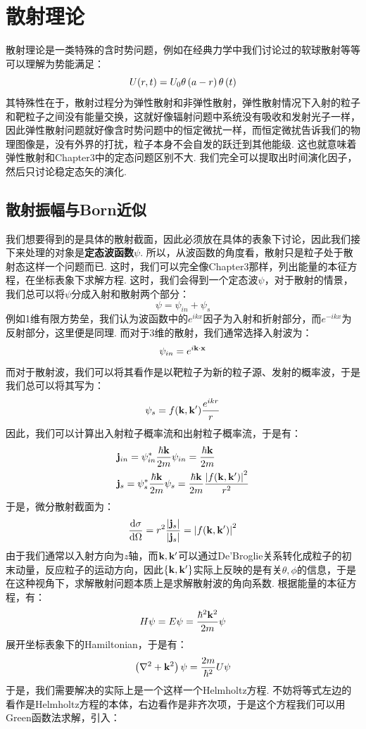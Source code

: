 \section{散射理论}
散射理论是一类特殊的含时势问题，例如在经典力学中我们讨论过的软球散射等等可以理解为势能满足：
\[
U(r,t) = U_{0}\theta\left({a - r}\right)\theta\left({t}\right)
\]
其特殊性在于，散射过程分为弹性散射和非弹性散射，弹性散射情况下入射的粒子和靶粒子之间没有能量交换，这就好像辐射问题中系统没有吸收和发射光子一样，因此弹性散射问题就好像含时势问题中的恒定微扰一样，而恒定微扰告诉我们的物理图像是，没有外界的打扰，粒子本身不会自发的跃迁到其他能级. 这也就意味着弹性散射和Chapter3中的定态问题区别不大. 我们完全可以提取出时间演化因子，然后只讨论稳定态矢的演化. 
\subsection{散射振幅与Born近似}
我们想要得到的是具体的散射截面，因此必须放在具体的表象下讨论，因此我们接下来处理的对象是\textbf{定态波函数\(\psi\)}. 所以，从波函数的角度看，散射只是粒子处于散射态这样一个问题而已. 这时，我们可以完全像Chapter3那样，列出能量的本征方程，在坐标表象下求解方程. 这时，我们会得到一个定态波\(\psi\)，对于散射的情景，我们总可以将\(\psi\)分成入射和散射两个部分：
\[
\psi = \psi_{in} + \psi_{s}
\]
例如1维有限方势垒，我们认为波函数中的\(e^{ikx}\)因子为入射和折射部分，而\(e^{-ikx}\)为反射部分，这里便是同理. 而对于3维的散射，我们通常选择入射波为：
\[
\psi_{in} = e^{i\mathbf{k}\cdot\mathbf{x}}
\]
而对于散射波，我们可以将其看作是以靶粒子为新的粒子源、发射的概率波，于是我们总可以将其写为：
\[
\psi_{s} = f(\mathbf{k},\mathbf{k}')\frac{e^{ikr}}{r}
\]
因此，我们可以计算出入射粒子概率流和出射粒子概率流，于是有：
\begin{align*}
& \mathbf{j}_{in} = \psi^{*}_{in}\frac{\hbar\mathbf{k}}{2m}\psi_{in} = \frac{\hbar\mathbf{k}}{2m} \\
& \mathbf{j}_{s} = \psi^{*}_{s}\frac{\hbar\mathbf{k}}{2m}\psi_{s} = \frac{\hbar\mathbf{k}}{2m}\frac{\abs{f(\mathbf{k},\mathbf{k}')}^{2}}{r^{2}}
\end{align*}
于是，微分散射截面为：
\[
\frac{\mathrm{d}{\sigma}}{\mathrm{d}\Omega} = r^{2}\frac{\abs{\mathbf{j}_{s}}}{\abs{\mathbf{j}_{s}}} = \abs{f(\mathbf{k},\mathbf{k}')}^{2}
\]
由于我们通常以入射方向为\(z\)轴，而\(\mathbf{k},\mathbf{k}'\)可以通过De'Broglie关系转化成粒子的初末动量，反应粒子的运动方向，因此\(\left\{{\mathbf{k},\mathbf{k}'}\right\}\)实际上反映的是有关\(\theta,\phi\)的信息，于是在这种视角下，求解散射问题本质上是求解散射波的角向系数. 根据能量的本征方程，有：
\[
H\psi = E\psi = \frac{\hbar^{2}\mathbf{k}^{2}}{2m}\psi
\]
展开坐标表象下的Hamiltonian，于是有：
\[
\left({\nabla^{2} + \mathbf{k}^{2}}\right)\psi = \frac{2m}{\hbar^{2}}U\psi
\]
于是，我们需要解决的实际上是一个这样一个Helmholtz方程. 不妨将等式左边的看作是Helmholtz方程的本体，右边看作是非齐次项，于是这个方程我们可以用Green函数法求解，引入：
